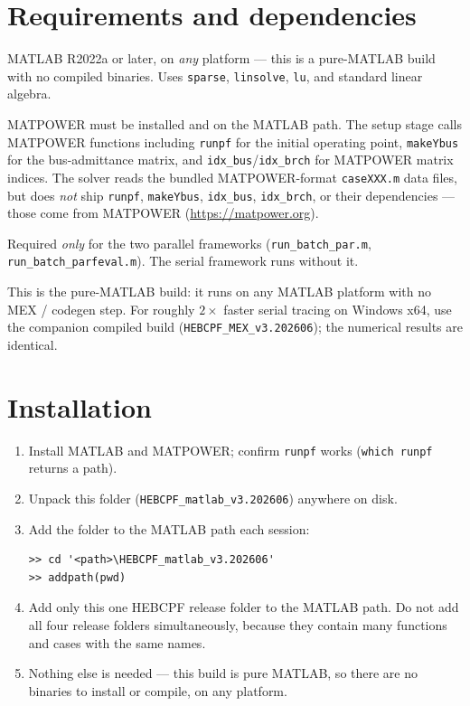 \documentclass[11pt,a4paper]{article}
\newcommand{\code}[1]{\texttt{#1}}
\begin{document}
\section{Requirements and dependencies}

\begin{description}[leftmargin=0em,style=nextline]
\item[MATLAB (required).] MATLAB R2022a or later, on \emph{any} platform --- this is a
      pure-MATLAB build with no compiled binaries. Uses \code{sparse}, \code{linsolve},
      \code{lu}, and standard linear algebra.
\item[MATPOWER (required).] MATPOWER must be installed and on the MATLAB path. The setup
      stage calls MATPOWER functions including \code{runpf} for the initial operating
      point, \code{makeYbus} for the bus-admittance matrix, and
      \code{idx_bus}/\code{idx_brch} for MATPOWER matrix indices. The solver reads the
      bundled MATPOWER-format \code{caseXXX.m} data files, but does \emph{not} ship
      \code{runpf}, \code{makeYbus}, \code{idx_bus}, \code{idx_brch}, or their
      dependencies --- those come from MATPOWER (\url{https://matpower.org}).
\item[Parallel Computing Toolbox (optional).] Required \emph{only} for the two parallel
      frameworks (\code{run_batch_par.m}, \code{run_batch_parfeval.m}). The serial
      framework runs without it.
\item[No compiler needed.] This is the pure-MATLAB build: it runs on any MATLAB platform
      with no MEX / codegen step. For roughly $2\times$ faster serial tracing on Windows
      x64, use the companion compiled build (\code{HEBCPF_MEX_v3.202606}); the numerical
      results are identical.
\end{description}

\section{Installation}

\begin{enumerate}[leftmargin=1.6em]
  \item Install MATLAB and MATPOWER; confirm \code{runpf} works
        (\code{which runpf} returns a path).
  \item Unpack this folder (\code{HEBCPF_matlab_v3.202606}) anywhere on disk.
  \item Add the folder to the MATLAB path each session:
\begin{lstlisting}
>> cd '<path>\HEBCPF_matlab_v3.202606'
>> addpath(pwd)
\end{lstlisting}
  \item Add only this one HEBCPF release folder to the MATLAB path. Do not add all four
        release folders simultaneously, because they contain many functions and cases with
        the same names.
  \item Nothing else is needed --- this build is pure MATLAB, so there are no binaries to
        install or compile, on any platform.
\end{enumerate}
\end{document}
